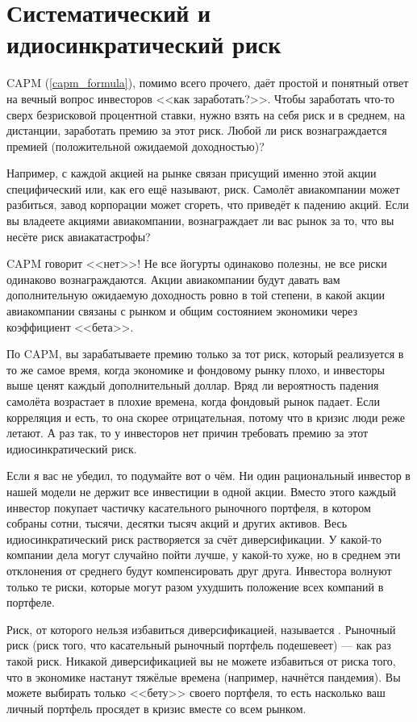 \section{Систематический и идиосинкратический риск}

CAPM (\ref{capm_formula}), помимо всего прочего, даёт простой и понятный ответ на вечный вопрос инвесторов <<как заработать?>>. Чтобы заработать что-то сверх безрисковой процентной ставки, нужно взять на себя риск и в среднем, на дистанции, заработать премию за этот риск. Любой ли риск вознаграждается премией (положительной ожидаемой доходностью)?

Например, с каждой акцией на рынке связан присущий именно этой акции специфический или, как его ещё называют,  риск. Самолёт авиакомпании может разбиться, завод корпорации может сгореть, что приведёт к падению акций. Если вы владеете акциями авиакомпании, вознаграждает ли вас рынок за то, что вы несёте риск авиакатастрофы?

CAPM говорит <<нет>>! Не все йогурты одинаково полезны, не все риски одинаково вознаграждаются. Акции авиакомпании будут давать вам дополнительную ожидаемую доходность ровно в той степени, в какой акции авиакомпании связаны с рынком и общим состоянием экономики через коэффициент <<бета>>.

По CAPM, вы зарабатываете премию только за тот риск, который реализуется в то же самое время, когда экономике и фондовому рынку плохо, и инвесторы выше ценят каждый дополнительный доллар. Вряд ли вероятность падения самолёта возрастает в плохие времена, когда фондовый рынок падает. Если корреляция и есть, то она скорее отрицательная, потому что в кризис люди реже летают. А раз так, то у инвесторов нет причин требовать премию за этот идиосинкратический риск. 

Если я вас не убедил, то подумайте вот о чём. Ни один рациональный инвестор в нашей модели не держит все инвестиции в одной акции. Вместо этого каждый инвестор покупает частичку касательного рыночного портфеля, в котором собраны сотни, тысячи, десятки тысяч акций и других активов. Весь идиосинкратический риск растворяется за счёт диверсификации. У какой-то компании дела могут случайно пойти лучше, у какой-то хуже, но в среднем эти отклонения от среднего будут компенсировать друг друга. Инвестора волнуют только те риски, которые могут разом ухудшить положение всех компаний в портфеле.

Риск, от которого нельзя избавиться диверсификацией, называется . Рыночный риск (риск того, что касательный рыночный портфель подешевеет) --- как раз такой риск. Никакой диверсификацией вы не можете избавиться от риска того, что в экономике настанут тяжёлые времена (например, начнётся пандемия). Вы можете выбирать только <<бету>> своего портфеля, то есть насколько ваш личный портфель просядет в кризис вместе со всем рынком.

